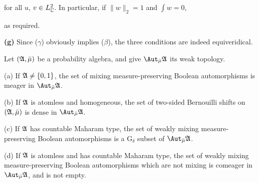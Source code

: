 {

\noindent for all $u$, $v\in L^2_{\Bbb C}$.   In particular, if $\|w\|_2=1$
and $\int w=0$,


\noindent as required.\ \Qed

\medskip

{\bf (g)} Since ($\gamma$) obviously implies ($\beta$), the three
conditions are indeed equiveridical.
}%

 Let $(\frak A,\bar\mu)$ be a probability algebra,
and give $\AmuA$ its weak topology.

(a) If $\frak A\ne\{0,1\}$,
the set of mixing measure-preserving Boolean automorphisms is meager in
$\AmuA$.

(b) If $\frak A$ is atomless and homogeneous, the set of
two-sided Bernouilli shifts on $(\frak A,\bar\mu)$ is dense in $\AmuA$.

(c) If $\frak A$ has countable Maharam type, the set of weakly mixing
measure-preserving Boolean automorphisms is a G$_{\delta}$ subset of
$\AmuA$.

(d) If $\frak A$ is atomless and has countable Maharam type, the set
of weakly mixing measure-preserving Boolean automorphisms which are not
mixing is comeager in $\AmuA$, and is not empty.

